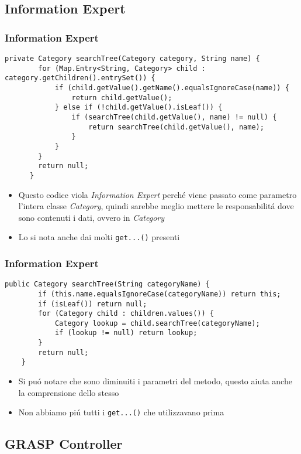 \subsection{Information Expert}
    \begin{frame} [fragile]
      \frametitle{Information Expert}
        \begin{lstlisting}[autogobble, title={\texttt{CategoryController.java}}]
            private Category searchTree(Category category, String name) {
        for (Map.Entry<String, Category> child : category.getChildren().entrySet()) {
            if (child.getValue().getName().equalsIgnoreCase(name)) {
                return child.getValue();
            } else if (!child.getValue().isLeaf()) {
                if (searchTree(child.getValue(), name) != null) {
                    return searchTree(child.getValue(), name);
                }
            }
        }
        return null;
      }
        \end{lstlisting}
      \begin{itemize}
          \item Questo codice viola \emph{Information Expert} perché
          viene passato come parametro l'intera classe \emph{Category}, quindi sarebbe meglio
          mettere le responsabilitá dove sono contenuti i dati, ovvero in \emph{Category}
          \item Lo si nota anche dai molti \texttt{get...()} presenti
      \end{itemize}
    \end{frame}

\begin{frame} [fragile]
    \frametitle{Information Expert}
    \begin{lstlisting}[autogobble, title={\texttt{Category.java}}]
        public Category searchTree(String categoryName) {
        if (this.name.equalsIgnoreCase(categoryName)) return this;
        if (isLeaf()) return null;
        for (Category child : children.values()) {
            Category lookup = child.searchTree(categoryName);
            if (lookup != null) return lookup;
        }
        return null;
    }
    \end{lstlisting}
    \begin{itemize}
        \item Si puó notare che sono diminuiti i parametri del metodo, questo aiuta anche la comprensione dello stesso
        \item Non abbiamo piú tutti i \texttt{get...()} che utilizzavano prima
    \end{itemize}
\end{frame}

\subsection{GRASP Controller}
